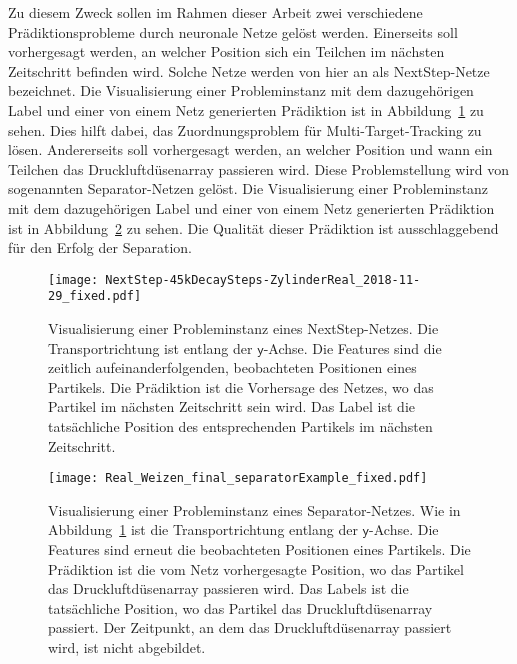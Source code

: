 Zu diesem Zweck sollen im Rahmen dieser Arbeit zwei verschiedene Prädiktionsprobleme durch neuronale Netze gelöst werden.
Einerseits soll vorhergesagt werden, an welcher Position sich ein Teilchen im nächsten Zeitschritt befinden wird.
Solche Netze werden von hier an als NextStep-Netze bezeichnet.
Die Visualisierung einer Probleminstanz mit dem dazugehörigen Label und einer von einem Netz generierten Prädiktion ist in Abbildung~\ref{fig:visualsNextstep} zu sehen.
Dies hilft dabei, das Zuordnungsproblem für Multi-Target-Tracking zu lösen.
Andererseits soll vorhergesagt werden, an welcher Position und wann ein Teilchen das Druckluftdüsenarray passieren wird.
Diese Problemstellung wird von sogenannten Separator-Netzen gelöst.
Die Visualisierung einer Probleminstanz mit dem dazugehörigen Label und einer von einem Netz generierten Prädiktion ist in Abbildung~\ref{fig:visualsSeparator} zu sehen.
Die Qualität dieser Prädiktion ist ausschlaggebend für den Erfolg der Separation.


\begin{figure}[p]
    \centering
    \texttt{[image: NextStep-45kDecaySteps-ZylinderReal\_2018-11-29\_fixed.pdf]}
    \caption[Visualisierung einer Probleminstanz eines NextStep-Netzes]{Visualisierung einer 
    Probleminstanz eines NextStep-Netzes. Die Transportrichtung ist entlang der \(\mathsf{y}\)-Achse.
    Die Features sind die zeitlich aufeinanderfolgenden, beobachteten Positionen eines Partikels.
    Die Prädiktion ist die Vorhersage des Netzes, wo das Partikel im nächsten Zeitschritt sein wird.
    Das Label ist die tatsächliche Position des entsprechenden Partikels im nächsten Zeitschritt.
    }
    \label{fig:visualsNextstep}
\end{figure}


\begin{figure}[p]
    \centering
	\texttt{[image: Real\_Weizen\_final\_separatorExample\_fixed.pdf]}
    \caption[Visualisierung einer Probleminstanz eines Separator-Netzes]{Visualisierung einer Probleminstanz 
    eines Separator-Netzes.
    Wie in Abbildung~\ref{fig:visualsNextstep} ist die Transportrichtung entlang der \(\mathsf{y}\)-Achse.
    Die Features sind erneut die beobachteten Positionen eines Partikels.
    Die Prädiktion ist die vom Netz vorhergesagte Position, wo das Partikel das Druckluftdüsenarray passieren wird.
    Das Labels ist die tatsächliche Position, wo das Partikel das Druckluftdüsenarray passiert.
    Der Zeitpunkt, an dem das Druckluftdüsenarray passiert wird, ist nicht abgebildet.
    }
	
	\label{fig:visualsSeparator}
\end{figure}



